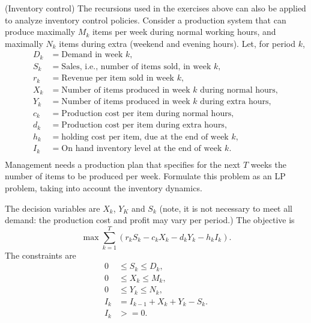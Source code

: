 \begin{question}(Inventory control) The recursions used in the
  exercises above can also be applied to analyze inventory control
  policies. Consider a production system that can produce maximally
  $M_k$ items per week during normal working hours, and maximally
  $N_k$ items during extra (weekend and evening hours). Let, for
  period $k$,
  \begin{align*}
    D_k &= \text{Demand in  week $k$}, \\
    S_k &= \text{Sales, i.e., number of items sold, in week $k$}, \\
    r_k &= \text{Revenue per item sold in week $k$}, \\
    X_k &= \text{Number of items produced in week $k$  during normal hours}, \\
    Y_k &= \text{Number of items produced in week $k$ during extra  hours}, \\
    c_k &= \text{Production cost per item during normal  hours}, \\
    d_k &= \text{Production cost per item during extra  hours}, \\
    h_k &= \text{holding cost per  item, due at the end of week $k$}, \\
    I_k &= \text{On hand inventory level at the end of week $k$}. \\
  \end{align*}
  Management needs a production plan that specifies for the next $T$
  weeks the number of items to be produced per week. Formulate this
  problem as an LP problem, taking into account the inventory
  dynamics.  


  \begin{solution}
    The decision variables are $X_k$, $Y_K$ and $S_k$ (note, it is not
    necessary to meet all demand:  the production cost and profit
    may vary per period.)  The objective is 
    \begin{equation*}
      \max \sum_{k=1}^T (r_kS_k -c_k X_k - d_k Y_k - h_k I_k).
    \end{equation*}
The constraints are 
\begin{align*}
  0&\leq S_k \leq D_k, \\
  0&\leq X_k \leq M_k, \\
  0&\leq Y_k \leq N_k, \\
  I_k&=I_{k-1}+X_k+Y_k - S_k. \\
I_k &>= 0.
\end{align*}
  \end{solution}
\end{question}

